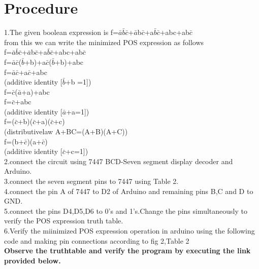 \documentclass[journal,12pt,twocolumn]{IEEEtran}
\begin{document}
\section{\textbf{Procedure}}
1.The given boolean expression is f=$\bar{a}$$\bar{b}$$\bar{c}$+$\bar{a}$b$\bar{c}$+a$\bar{b}$$\bar{c}$+abc+ab$\bar{c}$\\
from this we can write the minimized POS expression as follows\\
f=$\bar{a}$$\bar{b}$$\bar{c}$+$\bar{a}$b$\bar{c}$+a$\bar{b}$$\bar{c}$+abc+ab$\bar{c}$\\
f=$\bar{a}$$\bar{c}$($\bar{b}$+b)+a$\bar{c}$($\bar{b}$+b)+abc\\
f=$\bar{a}$$\bar{c}$+a$\bar{c}$+abc \\(additive identity [$\bar{b}$+b =1])\\
f=$\bar{c}$($\bar{a}$+a)+abc\\
f=$\bar{c}$+abc \\(additive identity [$\bar{a}$+a=1])\\
f=($\bar{c}$+b)($\bar{c}$+a)($\bar{c}$+c)\\(distributivelaw A+BC=(A+B)(A+C))\\
f=(b+$\bar{c}$)(a+$\bar{c}$) \\(additive identity [$\bar{c}$+c=1])\\
2.connect the circuit using 7447 BCD-Seven segment display decoder and Arduino.\\
3.connect the seven segment pins to 7447 using Table 2.\\
4.connect the pin A of 7447 to D2 of Arduino and remaining pins B,C and D to GND.\\ 
5.connect the pins D4,D5,D6 to 0's and 1's.Change the pins simultaneously to verify the POS expression truth table.\\
6.Verify the miinimized POS expression operation in arduino using the following code and making pin connections according to fig 2,Table 2\\

\textbf{Observe the truthtable and verify the program by executing the link provided below.}\\
\begin{center}
\end{center}
\end{document}
